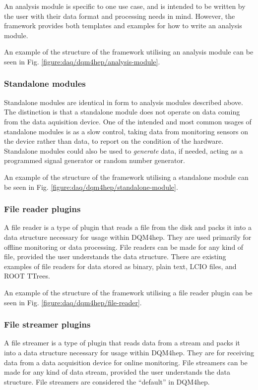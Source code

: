 An analysis module is specific to one use case, and is intended to be written by the user with their data format and processing needs in mind. However, the framework provides both templates and examples for how to write an analysis module. 

An example of the structure of the framework utilising an analysis module can be seen in Fig. \ref{figure:daq/dqm4hep/analysis-module}.

\subsubsection{Standalone modules}
Standalone modules are identical in form to analysis modules described above. The distinction is that a standalone module does not operate on data coming from the data aquisition device. One of the intended and most common usages of standalone modules is as a slow control, taking data from monitoring sensors on the device rather than data, to report on the condition of the hardware. Standalone modules could also be used to \emph{generate} data, if needed, acting as a programmed signal generator or random number generator. 

An example of the structure of the framework utilising a standalone module can be seen in Fig. \ref{figure:daq/dqm4hep/standalone-module}.

\subsubsection{File reader plugins}
A file reader is a type of plugin that reads a file from the disk and packs it into a data structure necessary for usage within DQM4hep. They are used primarily for offline monitoring or data processing. File readers can be made for any kind of file, provided the user understands the data structure. There are existing examples of file readers for data stored as binary, plain text, LCIO files, and ROOT TTrees. 

An example of the structure of the framework utilising a file reader plugin can be seen in Fig. \ref{figure:daq/dqm4hep/file-reader}.

\subsubsection{File streamer plugins}
A file streamer is a type of plugin that reads data from a stream and packs it into a data structure necessary for usage within DQM4hep. They are for receiving data from a data acquisition device for online monitoring. File streamers can be made for any kind of data stream, provided the user understands the data structure. File streamers are considered the ``default'' in DQM4hep.

